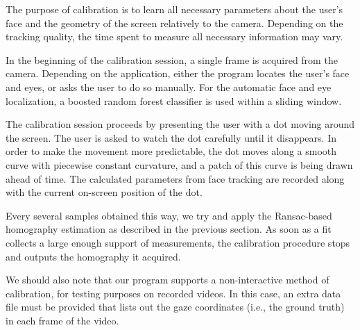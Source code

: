 The purpose of calibration is to learn all necessary parameters about the user's face and the geometry of the screen relatively to the camera.
Depending on the tracking quality, the time spent to measure all necessary information may vary.

In the beginning of the calibration session, a single frame is acquired from the camera.
Depending on the application, either the program locates the user's face and eyes, or asks the user to do so manually.
For the automatic face and eye localization, a boosted random forest classifier is used within a sliding window.

The calibration session proceeds by presenting the user with a dot moving around the screen.
The user is asked to watch the dot carefully until it disappears.
In order to make the movement more predictable, the dot moves along a smooth curve with piecewise constant curvature, and a patch of this curve is being drawn ahead of time.
The calculated parameters from face tracking are recorded along with the current on-screen position of the dot.

Every several samples obtained this way, we try and apply the Ransac-based homography estimation as described in the previous section.
As soon as a fit collects a large enough support of measurements, the calibration procedure stops and outputs the homography it acquired.

We should also note that our program supports a non-interactive method of calibration, for testing purposes on recorded videos.
In this case, an extra data file must be provided that lists out the gaze coordinates (i.e., the ground truth) in each frame of the video.
